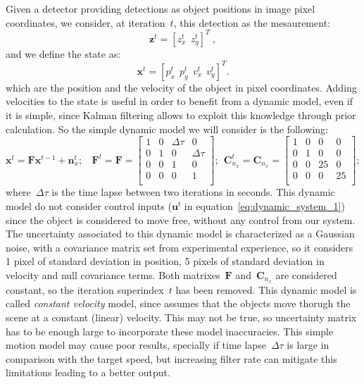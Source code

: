 Given a detector providing detections as object positions in image pixel coordinates, we consider, at iteration~$t$, this detection as the mesaurement:
\begin{equation}
 \mathbf{z}^t = [z^t_x\ \ z^t_y]^T \ ,
\end{equation}
and we define the state as:
\begin{equation}
 \mathbf{x}^t = [p^t_x\ \ p^t_y\ \ v^t_x\ \ v^t_y]^T.
\end{equation}
which are the position and the velocity of the object in pixel coordinates. Adding velocities to the state is useful in order to benefit from a dynamic model, even if it is simple, since Kalman filtering allows to exploit this knowledge through prior calculation. So the simple dynamic model we will consider is the following:
\begin{equation}
 \mathbf{x}^t = \mathbf{F}\mathbf{x}^{t-1} + \mathbf{n}^t_{x}; \ \ \ \
\mathbf{F}^t = \mathbf{F} = 
\left[
 \begin{array}{cccc}
  1 & 0 & \Delta\tau & 0 \\
  0 & 1 & 0 & \Delta\tau \\
  0 & 0 & 1 & 0 \\
  0 & 0 & 0 & 1 \\
 \end{array}
 \right]; \ \ 
 \mathbf{C}^t_{n_x} = \mathbf{C}_{n_x} = 
\left[
 \begin{array}{cccc}
  1 & 0 & 0 & 0 \\
  0 & 1 & 0 & 0 \\
  0 & 0 & 25 & 0 \\
  0 & 0 & 0 & 25 \\
 \end{array}
 \right]; \ \ 
\end{equation}
where~$\Delta\tau$ is the time lapse between two iterations in seconds. This dynamic model do not consider control inputs ($\mathbf{u}^t$ in equation~\ref{eq:dynamic_system_1}) since the object is considered to move free, without any control from our system. The uncertainty associated to this dynamic model is characterized as a Gaussian noise, with a covariance matrix set from experimental experience, so it considers 1 pixel of standard deviation in position, 5 pixels of standard deviation in velocity and null covariance terms. Both matrixes~$\mathbf{F}$ and~$\mathbf{C}_{n_x}$ are considered constant, so the iteration superindex~$t$ has been removed. This dynamic model is called \textit{constant velocity} model, since assumes that the objects move thorugh the scene at a constant (linear) velocity. This may not be true, so uncertainty matrix has to be enough large to incorporate these model inaccuracies. This simple motion model may cause poor results, specially if time lapse~$\Delta\tau$ is large in comparison with the target speed, but increasing filter rate can mitigate this limitations leading to a better output.

